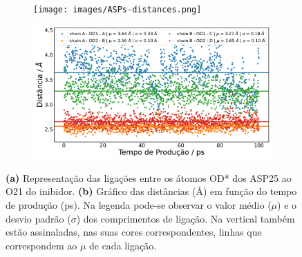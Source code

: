 \documentclass[12pt,a4paper]{article}
\begin{document}
	\begin{figure}[h]
		\begin{subfigure}[b]{0.34\textwidth}
			\centering
			\texttt{[image: images/ASPs-distances.png]}
			\caption{}
			\label{fig:an:dists-vmd}
		\end{subfigure}
		\begin{subfigure}[b]{0.64\textwidth}
			\centering
			\includegraphics[width=\textwidth]{images/plots-ASP-1UN.pdf}
			\caption{}
			\label{fig:an:dists-plot}
		\end{subfigure}
		\caption{\textbf{(a)} Representação das ligações entre os átomos OD* dos ASP25 ao O21 do inibidor. \textbf{(b)} Gráfico das distâncias (\AA) em função do tempo de produção (ps). Na legenda pode-se observar o valor médio ($\mu$) e o desvio padrão ($\sigma$) dos comprimentos de ligação. Na vertical também estão assinaladas, nas suas cores correspondentes, linhas que correspondem ao $\mu$ de cada ligação.}
		\label{fig:an:ASP-1UN}
	\end{figure}

\newpage


\end{document}
